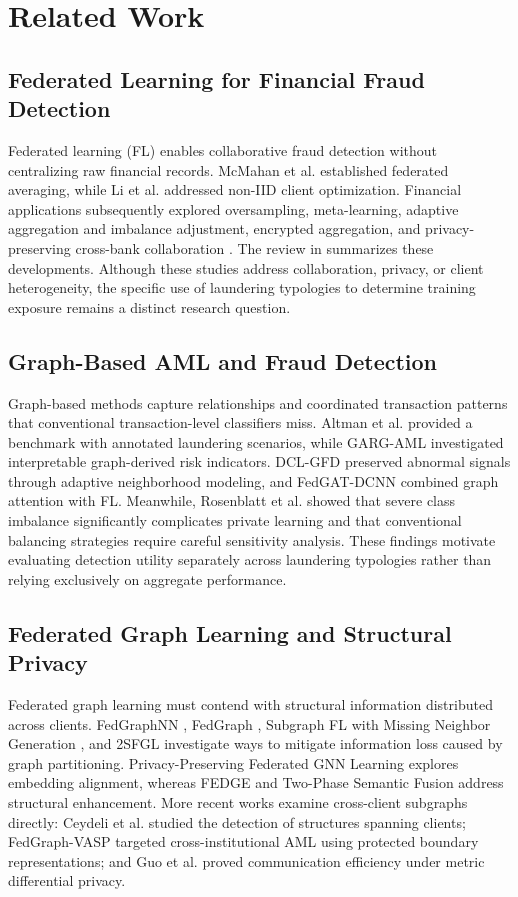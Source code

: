 \documentclass[conference]{IEEEtran}
\begin{document}
\section{Related Work}
\subsection{Federated Learning for Financial Fraud Detection}
Federated learning (FL) enables collaborative fraud detection without centralizing raw financial records. McMahan et al. \cite{b10} established federated averaging, while Li et al. \cite{b11} addressed non-IID client optimization. Financial applications subsequently explored oversampling, meta-learning, adaptive aggregation and imbalance adjustment, encrypted aggregation, and privacy-preserving cross-bank collaboration \cite{b9, b14, b15, b16}. The review in \cite{b20} summarizes these developments. Although these studies address collaboration, privacy, or client heterogeneity, the specific use of laundering typologies to determine training exposure remains a distinct research question.

\subsection{Graph-Based AML and Fraud Detection}
Graph-based methods capture relationships and coordinated transaction patterns that conventional transaction-level classifiers miss. Altman et al. \cite{b21} provided a benchmark with annotated laundering scenarios, while GARG-AML \cite{b22} investigated interpretable graph-derived risk indicators. DCL-GFD \cite{b8} preserved abnormal signals through adaptive neighborhood modeling, and FedGAT-DCNN \cite{b24} combined graph attention with FL. Meanwhile, Rosenblatt et al. \cite{b4} showed that severe class imbalance significantly complicates private learning and that conventional balancing strategies require careful sensitivity analysis. These findings motivate evaluating detection utility separately across laundering typologies rather than relying exclusively on aggregate performance.

\subsection{Federated Graph Learning and Structural Privacy}
Federated graph learning must contend with structural information distributed across clients. FedGraphNN \cite{b25}, FedGraph \cite{b26}, Subgraph FL with Missing Neighbor Generation \cite{b27}, and 2SFGL \cite{b28} investigate ways to mitigate information loss caused by graph partitioning. Privacy-Preserving Federated GNN Learning \cite{b29} explores embedding alignment, whereas FEDGE \cite{b6} and Two-Phase Semantic Fusion \cite{b30} address structural enhancement. More recent works examine cross-client subgraphs directly: Ceydeli et al. \cite{b7} studied the detection of structures spanning clients; FedGraph-VASP \cite{b2} targeted cross-institutional AML using protected boundary representations; and Guo et al. \cite{b3} proved communication efficiency under metric differential privacy.
\end{document}

